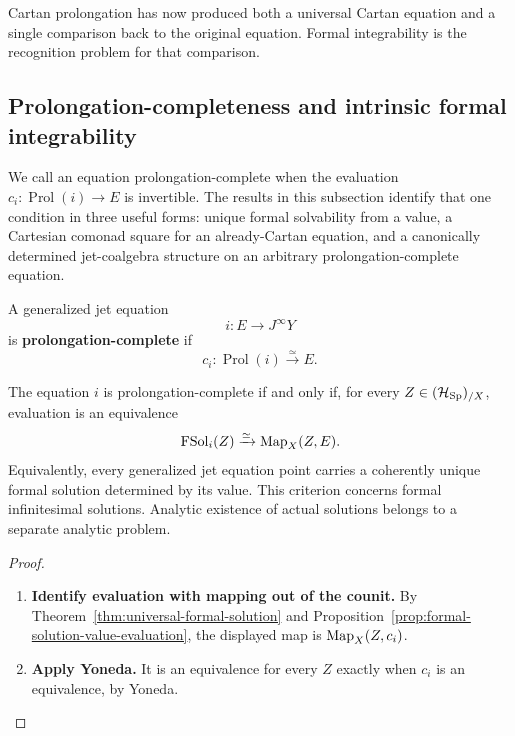 Cartan prolongation has now produced both a universal Cartan equation and a
single comparison back to the original equation. Formal integrability is the
recognition problem for that comparison.

\subsection{Prolongation-completeness and intrinsic formal integrability}
\label{sec:prolongation-completeness}

We call an equation prolongation-complete when the evaluation
\(c_i:\operatorname{Prol}(i)\to E\) is invertible. The results in this
subsection identify that one condition in three useful forms: unique formal
solvability from a value, a Cartesian comonad square for an already-Cartan
equation, and a canonically determined jet-coalgebra structure on an arbitrary
prolongation-complete equation.
\begin{definition}
A generalized jet equation
\[
  i:E\to J^\infty Y
\]
is \textbf{prolongation-complete} if
\[
  c_i:\operatorname{Prol}(i)\xrightarrow{\simeq}E.
\]
\end{definition}

\begin{theorem}
\label{thm:prolongation-complete-formal-solutions}
The equation \(i\) is prolongation-complete if and only if, for every
\(Z\in(\mathcal H_{\operatorname{Sp}})_{/X}\), evaluation is an equivalence
\[
  \operatorname{FSol}_i(Z)
  \xrightarrow{\simeq}
  \operatorname{Map}_X(Z,E).
\]
Equivalently, every generalized jet equation point carries a coherently unique
formal solution determined by its value. This criterion concerns formal infinitesimal solutions. Analytic existence
of actual solutions belongs to a separate analytic problem.
\end{theorem}

\begin{proof}
\leavevmode
\begin{enumerate}[label=\textup{(\arabic*)}]
    \item \textbf{Identify evaluation with mapping out of the counit.}
By Theorem~\ref{thm:universal-formal-solution} and
Proposition~\ref{prop:formal-solution-value-evaluation}, the displayed map is
\(\operatorname{Map}_X(Z,c_i)\).

    \item \textbf{Apply Yoneda.}
It is an equivalence for every \(Z\) exactly when
\(c_i\) is an equivalence, by Yoneda.
\end{enumerate}
\end{proof}

